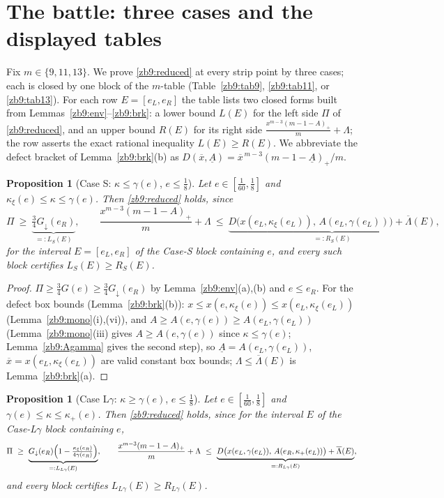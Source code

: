 \documentclass[11pt]{article}
\newtheorem{proposition}[lemma]{Proposition}
\theoremstyle{remark}
\newcommand{\kxi}{\kappa_\xi}
\newcommand{\khi}{\kappa_{+}}
\begin{document}
\section{The battle: three cases and the displayed tables}\label{zb9:sec:battle}

Fix $m\in\{9,11,13\}$.  We prove \eqref{zb9:reduced} at every strip point by
three cases; each is closed by one block of the $m$-table
(Table~\ref{zb9:tab9}, \ref{zb9:tab11}, or \ref{zb9:tab13}).  For each row
$E=[e_L,e_R]$ the table lists two closed forms built from
Lemmas~\ref{zb9:env}--\ref{zb9:brk}: a lower bound $L(E)$ for the left side
$\Pi$ of \eqref{zb9:reduced}, and an upper bound $R(E)$ for its right side
$\tfrac{x^{m-3}(m-1-A)_+}{m}+\Lambda$; the row asserts the exact rational
inequality $L(E)\ge R(E)$.  We abbreviate the defect bracket of
Lemma~\ref{zb9:brk}(b) as $D(\overline x,\underline A)
=\overline x^{\,m-3}(m-1-\underline A)_+/m$.

\begin{proposition}[Case S: $\kappa\le\gamma(e)$, $e\le\tfrac18$]\label{zb9:caseS}
Let $e\in[\tfrac1{60},\tfrac18]$ and $\kxi(e)\le\kappa\le\gamma(e)$.  Then
\eqref{zb9:reduced} holds, since
\[
        \Pi\ \ge\ \underbrace{\tfrac34 G_\downarrow(e_R)}_{=:L_S(E)},
        \qquad
        \frac{x^{m-3}(m-1-A)_+}{m}+\Lambda\ \le\
        \underbrace{D\bigl(x(e_L,\kxi(e_L)),\,A(e_L,\gamma(e_L))\bigr)
        +\overline\Lambda(E)}_{=:R_S(E)},
\]
for the interval $E=[e_L,e_R]$ of the Case-S block containing $e$, and every
such block certifies $L_S(E)\ge R_S(E)$.
\end{proposition}

\begin{proof}
$\Pi\ge\tfrac34 G(e)\ge\tfrac34G_\downarrow(e_R)$ by
Lemma~\ref{zb9:env}(a),(b) and $e\le e_R$.  For the defect box bounds
(Lemma~\ref{zb9:brk}(b)): $x\le x(e,\kxi(e))\le x(e_L,\kxi(e_L))$
(Lemma~\ref{zb9:mono}(i),(vi)), and $A\ge A(e,\gamma(e))\ge A(e_L,\gamma(e_L))$
(Lemma~\ref{zb9:mono}(iii) gives $A\ge A(e,\gamma(e))$ since
$\kappa\le\gamma(e)$; Lemma~\ref{zb9:Agamma} gives the second step), so
$\underline A=A(e_L,\gamma(e_L))$, $\overline x=x(e_L,\kxi(e_L))$ are valid
constant box bounds; $\Lambda\le\overline\Lambda(E)$ is
Lemma~\ref{zb9:brk}(a).
\end{proof}

\begin{proposition}[Case L$\gamma$: $\kappa\ge\gamma(e)$, $e\le\tfrac18$]
\label{zb9:caseLg}
Let $e\in[\tfrac1{60},\tfrac18]$ and $\gamma(e)\le\kappa\le\khi(e)$.  Then
\eqref{zb9:reduced} holds, since for the interval $E$ of the Case-L$\gamma$
block containing $e$,
\[
        \Pi\ \ge\ \underbrace{G_\downarrow(e_R)\Bigl(1-\tfrac{\kxi(e_R)}{4\gamma(e_R)}\Bigr)}_{=:L_{L\gamma}(E)},
        \qquad
        \frac{x^{m-3}(m-1-A)_+}{m}+\Lambda\ \le\
        \underbrace{D\bigl(x(e_L,\gamma(e_L)),\,A(e_R,\khi(e_L))\bigr)
        +\overline\Lambda(E)}_{=:R_{L\gamma}(E)},
\]
and every block certifies $L_{L\gamma}(E)\ge R_{L\gamma}(E)$.
\end{proposition}
\end{document}

